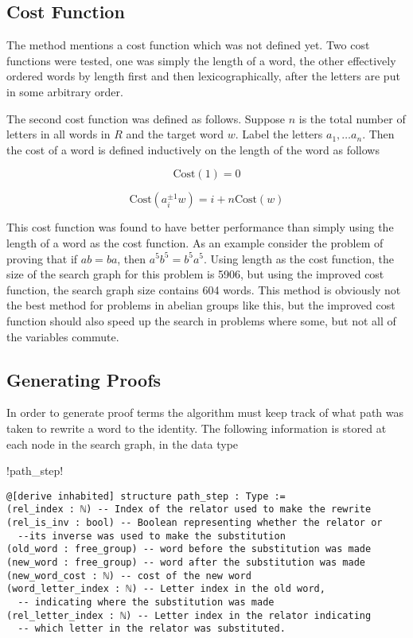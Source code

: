 \documentclass[12pt]{article} %
\theoremstyle{definition}
\theoremstyle{definition}
\theoremstyle{definition}
\theoremstyle{definition}
\theoremstyle{definition}
\theoremstyle{definition}
\begin{document}
\subsection{Cost Function}

The method mentions a cost function which was not defined yet. Two cost functions
were tested, one was simply the length of a word, the other effectively ordered words
by length first and then lexicographically, after the letters are put in some arbitrary order.

The second cost function was defined as follows. Suppose $n$ is the total number of
letters in all words in $R$ and the target word $w$.
Label the letters $a_1, \dots a_n$. Then the cost of a word is defined inductively on the
length of the word as follows

\begin{equation}
  \text{Cost}(1) = 0
\end{equation}

\begin{equation}
  \text{Cost}(a_i^{\pm1} w) = i + n \text{Cost}(w)
\end{equation}


This cost function was found to have better performance than simply using the length of a word
as the cost function. As an example consider the problem of proving that
if $ab = ba$, then $a^5b^5=b^5a^5$. Using length as the cost function, the size
of the search graph for this problem is 5906, but using the improved cost function,
the search graph size contains 604 words. This method is obviously not the
best method for problems in abelian groups like this, but the improved cost
function should also speed up the search in problems where some, but not all
of the variables commute.

\subsection{Generating Proofs}
In order to generate proof terms the algorithm must keep track of what path was taken
to rewrite a word to the identity. The following information is stored at each node
in the search graph, in the data type
\begin{lstinline}
  !path_step!
\end{lstinline}

\begin{lstlisting}
@[derive inhabited] structure path_step : Type :=
(rel_index : ℕ) -- Index of the relator used to make the rewrite
(rel_is_inv : bool) -- Boolean representing whether the relator or
  --its inverse was used to make the substitution
(old_word : free_group) -- word before the substitution was made
(new_word : free_group) -- word after the substitution was made
(new_word_cost : ℕ) -- cost of the new word
(word_letter_index : ℕ) -- Letter index in the old word,
  -- indicating where the substitution was made
(rel_letter_index : ℕ) -- Letter index in the relator indicating
  -- which letter in the relator was substituted.
\end{lstlisting}
\end{document}
